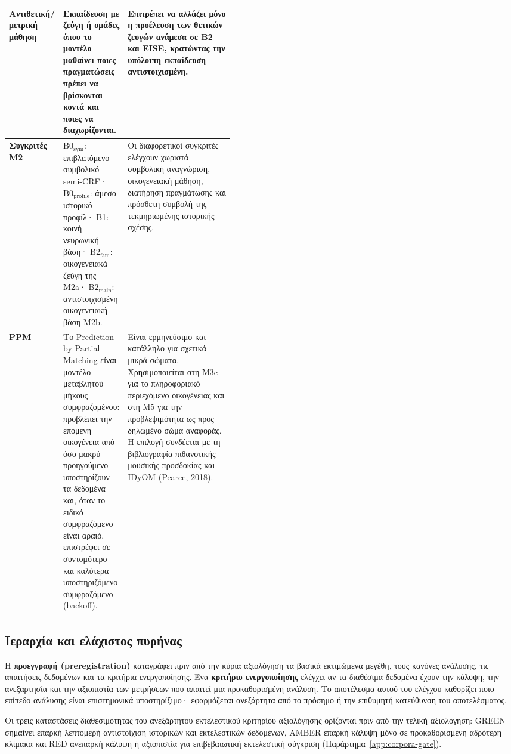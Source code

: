 \documentclass[11pt,a4paper]{article}
\begin{document}
{\begin{xltabular}{\linewidth}{@{}>{\RaggedRight\arraybackslash}p{0.19\linewidth}>{\RaggedRight\arraybackslash}p{0.25\linewidth}Y@{}}
\midrule
\textbf{Αντιθετική/μετρική μάθηση} & Εκπαίδευση με ζεύγη ή ομάδες όπου το μοντέλο μαθαίνει ποιες πραγματώσεις πρέπει να βρίσκονται κοντά και ποιες να διαχωρίζονται. & Επιτρέπει να αλλάζει μόνο η προέλευση των θετικών ζευγών ανάμεσα σε B2 και EISE, κρατώντας την υπόλοιπη εκπαίδευση αντιστοιχισμένη.\tabularnewline
\midrule
\textbf{Συγκριτές Μ2} & $\mathrm{B0}_{\mathrm{sym}}$: επιβλεπόμενο συμβολικό semi-CRF· $\mathrm{B0}_{\mathrm{profile}}$: άμεσο ιστορικό προφίλ· B1: κοινή νευρωνική βάση· $\mathrm{B2}_{\mathrm{fam}}$: οικογενειακά ζεύγη της Μ2a· $\mathrm{B2}_{\mathrm{main}}$: αντιστοιχισμένη οικογενειακή βάση Μ2b. & Οι διαφορετικοί συγκριτές ελέγχουν χωριστά συμβολική αναγνώριση, οικογενειακή μάθηση, διατήρηση πραγμάτωσης και πρόσθετη συμβολή της τεκμηριωμένης ιστορικής σχέσης.\tabularnewline
\midrule
\textbf{PPM} & Το Prediction by Partial Matching είναι μοντέλο μεταβλητού μήκους συμφραζομένου: προβλέπει την επόμενη οικογένεια από όσο μακρύ προηγούμενο υποστηρίζουν τα δεδομένα και, όταν το ειδικό συμφραζόμενο είναι αραιό, επιστρέφει σε συντομότερο και καλύτερα υποστηριζόμενο συμφραζόμενο (backoff). & Είναι ερμηνεύσιμο και κατάλληλο για σχετικά μικρά σώματα. Χρησιμοποιείται στη M3c για το πληροφοριακό περιεχόμενο οικογένειας και στη M5 για την προβλεψιμότητα ως προς δηλωμένο σώμα αναφοράς. Η επιλογή συνδέεται με τη βιβλιογραφία πιθανοτικής μουσικής προσδοκίας και IDyOM (Pearce, 2018).\tabularnewline
\end{xltabular}
}\par

\subsection{Ιεραρχία και ελάχιστος πυρήνας}\label{sec:core-hierarchy}

Η \textbf{προεγγραφή (preregistration)} καταγράφει πριν από την κύρια αξιολόγηση τα βασικά εκτιμώμενα μεγέθη, τους κανόνες ανάλυσης, τις απαιτήσεις δεδομένων και τα κριτήρια ενεργοποίησης. Ένα \textbf{κριτήριο ενεργοποίησης} ελέγχει αν τα διαθέσιμα δεδομένα έχουν την κάλυψη, την ανεξαρτησία και την αξιοπιστία των μετρήσεων που απαιτεί μια προκαθορισμένη ανάλυση. Το αποτέλεσμα αυτού του ελέγχου καθορίζει ποιο επίπεδο ανάλυσης είναι επιστημονικά υποστηρίξιμο· εφαρμόζεται ανεξάρτητα από το πρόσημο ή την επιθυμητή κατεύθυνση του αποτελέσματος.

Οι τρεις καταστάσεις διαθεσιμότητας του ανεξάρτητου εκτελεστικού κριτηρίου αξιολόγησης ορίζονται πριν από την τελική αξιολόγηση: GREEN σημαίνει επαρκή λεπτομερή αντιστοίχιση ιστορικών και εκτελεστικών δεδομένων, AMBER επαρκή κάλυψη μόνο σε προκαθορισμένη αδρότερη κλίμακα και RED ανεπαρκή κάλυψη ή αξιοπιστία για επιβεβαιωτική εκτελεστική σύγκριση (Παράρτημα~\ref{app:corpora-gate}).
\end{document}
